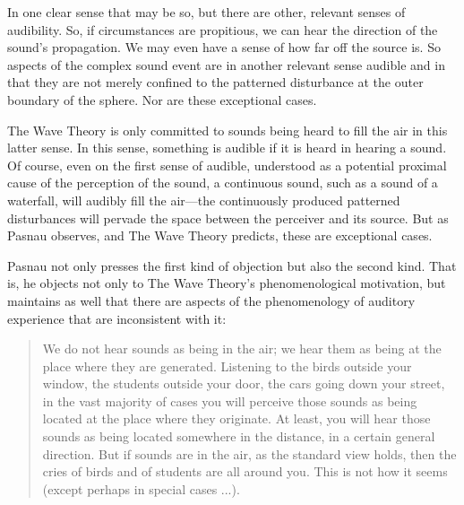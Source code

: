 \documentclass[12pt]{article}
\begin{document}
In one clear sense that may be so, but there are other, relevant senses of audibility. So, if circumstances are propitious, we can hear the direction of the sound's propagation. We may even have a sense of how far off the source is. So aspects of the complex sound event are in another relevant sense audible and in that they are not merely confined to the patterned disturbance at the outer boundary of the sphere. Nor are these exceptional cases. 

The Wave Theory is only committed to sounds being heard to fill the air in this latter sense. In this sense, something is audible if it is heard in hearing a sound. Of course, even on the first sense of audible, understood as a potential proximal cause of the perception of the sound, a continuous sound, such as a sound of a waterfall, will audibly fill the air---the continuously produced patterned disturbances will pervade the space between the perceiver and its source. But as Pasnau observes, and The Wave Theory predicts, these are exceptional cases.

Pasnau not only presses the first kind of objection but also the second kind. That is, he objects not only to The Wave Theory’s phenomenological motivation, but maintains as well that there are aspects of the phenomenology of auditory experience that are inconsistent with it:
\begin{quote}
	We do not hear sounds as being in the air; we hear them as being at the place where they are generated. Listening to the birds outside your window, the students outside your door, the cars going down your street, in the vast majority of cases you will perceive those sounds as being located at the place where they originate. At least, you will hear those sounds as being located somewhere in the distance, in a certain general direction. But if sounds are in the air, as the standard view holds, then the cries of birds and of students are all around you. This is not how it seems (except perhaps in special cases ...). 
\end{quote}
\end{document}
